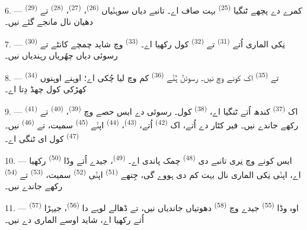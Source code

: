 \VUsaut{4.0mm}
\VUsaut{3.0mm}

6. --- کمرے دے پچھے ٹنگیا  \textsuperscript{(25)} بہت صاف اے۔
تانبے دیاں سوہݨیاں  \textsuperscript{(26)}، 
\textsuperscript{(27)}،  \textsuperscript{(28)} تے 
\textsuperscript{(29)} دھیان نال مانجے گئے نیں۔

7. ---  \textsuperscript{(30)} نِکی الماری اُتے 
\textsuperscript{(31)} تے  \textsuperscript{(32)} کول رکھیا
اے۔  \textsuperscript{(33)} وچ شاید چمچے کانٹے تے رسوئی دیاں چھُریاں
رہندیاں نیں۔

8. ---  \textsuperscript{(34)} تے 
\textsuperscript{(35)} اک کونے وچ نیں۔ رسوئݨ ہُݨے 
\textsuperscript{(36)} کم وچ لیا چُکی اے؛ اوہنے اوہنوں کھڑکی کول چھڈ دِتا اے۔

9. --- اک  \textsuperscript{(37)} کندھ اُتے ٹنگیا اے،
 \textsuperscript{(38)} کول۔ رسوئی دے ایس حصے وچ 
\textsuperscript{(39)}،  \textsuperscript{(40)} تے
 \textsuperscript{(41)} رکھے جاندے نیں۔ فیر کٹار دے اُتے، اک
 \textsuperscript{(42)} اُتے،  \textsuperscript{(43)}،
 \textsuperscript{(44)} اپݨے  \textsuperscript{(45)}
سمیت، تے  \textsuperscript{(46)} نیں۔ 
\textsuperscript{(47)} کول ای ٹنگی اے۔

10. --- ایس کونے وچ نِری تانبے دی  \textsuperscript{(48)} چمک پاندی
اے۔  \textsuperscript{(49)}، جیدے اُتے وڈا 
\textsuperscript{(50)} رکھیا اے، اپݨی نِکی الماری نال بہت کم دی ہووے گی، جِتھے
 \textsuperscript{(51)} اپݨی 
\textsuperscript{(52)} سمیت،  \textsuperscript{(53)} تے
 \textsuperscript{(54)} رکھے جاندے نیں۔

\VUsaut{4.0mm}
\VUsaut{3.0mm}

11. --- اوہ وڈا  \textsuperscript{(55)} جیدے وچ 
\textsuperscript{(58)} دھوتیاں جاندیاں نیں، تے ڈھالے لوہے دا 
\textsuperscript{(56)}، جیہڑا  \textsuperscript{(57)} اُتے رکھیا
اے، شاید اوسے الماری دے نیں۔

